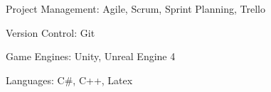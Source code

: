 


\begin{cvparagraph}
    
    \begin{cvitems}
        \text{}
        \item
        \item Project Management: Agile, Scrum, Sprint Planning, Trello
        \item Version Control: Git
        \item Game Engines: Unity, Unreal Engine 4
        \item Languages: C\#, C++, Latex
    \end{cvitems}

\end{cvparagraph}